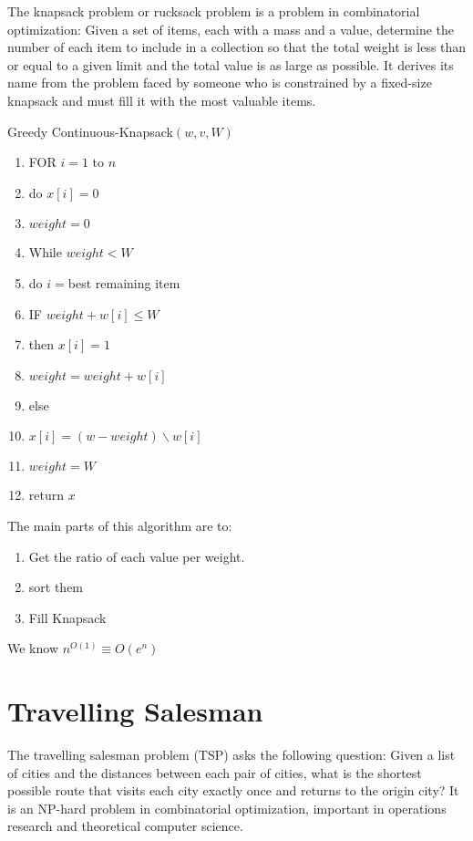 \documentclass[10 pt]{article}
\begin{document}
\begin{multicols}{2}
The knapsack problem or rucksack problem is a problem in combinatorial optimization: Given a set of items, each with a mass and a value, determine the number of each item to include in a collection so that the total weight is less than or equal to a given limit and the total value is as large as possible. It derives its name from the problem faced by someone who is constrained by a fixed-size knapsack and must fill it with the most valuable items.


Greedy Continuous-Knapsack$(w,v,W)$
\begin{enumerate}
\item FOR $i=1$ to $n$
\item \hspace{10pt} do $x[i] = 0$
\item $weight = 0$
\item While $weight < W$
\item \hspace{10pt} do $i = $best remaining item
\item \hspace{20pt} IF $weight + w[i] \leq W$
\item \hspace{30pt} then $x[i] = 1$
\item \hspace{40pt} $weight = weight + w[i]$
\item \hspace{30pt} else
\item \hspace{40pt} $x[i] = (w-weight) \backslash w[i]$
\item \hspace{40pt} $weight = W$
\item return $x$
\end{enumerate} \hfill \break
The main parts of this algorithm are to:
\begin{enumerate}
\item Get the ratio of each value per weight.
\item sort them
\item Fill Knapsack
\end{enumerate} 

We know $n^{O(1)} \equiv O(e^n)$

\end{multicols}
\section{Travelling Salesman}
The travelling salesman problem (TSP) asks the following question: Given a list of cities and the distances between each pair of cities, what is the shortest possible route that visits each city exactly once and returns to the origin city? It is an NP-hard problem in combinatorial optimization, important in operations research and theoretical computer science.
\end{document}
